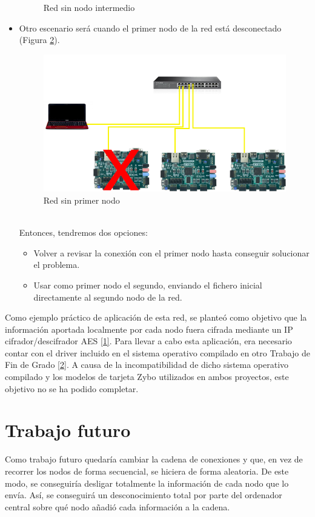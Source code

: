 \begin{itemize}
\begin{figure}[h]
		\caption{Red sin nodo intermedio}
		\label{Red sin nodo intermedio}
	\end{figure}
	\item Otro escenario será cuando el primer nodo de la red está desconectado (Figura \ref{Red sin primer nodo}).
	\begin{figure}[h]
		\centering
		\includegraphics[scale=0.5]{Epilogo/RedSinNodo1.png}
		\caption{Red sin primer nodo}
		\label{Red sin primer nodo}
	\end{figure}\\
	Entonces, tendremos dos opciones:
	\begin{itemize}
		\item Volver a revisar la conexión con el primer nodo hasta conseguir solucionar el problema.
		\item Usar como primer nodo el segundo, enviando el fichero inicial directamente al segundo nodo de la red.
	\end{itemize}
\end{itemize}

Como ejemplo práctico de aplicación de esta red, se planteó como objetivo que la información aportada localmente por cada nodo fuera cifrada mediante un IP cifrador/descifrador AES \hyperlink{1}{[1]}. Para llevar a cabo esta aplicación, era necesario contar con el driver incluido en el sistema operativo compilado en otro Trabajo de Fin de Grado \hyperlink{2}{[2]}. A causa de la incompatibilidad de dicho sistema operativo compilado y los modelos de tarjeta Zybo utilizados en ambos proyectos, este objetivo no se ha podido completar.

\section{Trabajo futuro}
Como trabajo futuro quedaría cambiar la cadena de conexiones y que, en vez de recorrer los nodos de forma secuencial, se hiciera de forma aleatoria. De este modo, se conseguiría desligar totalmente la información de cada nodo que lo envía. Así, se conseguirá un desconocimiento total por parte del ordenador central sobre qué nodo añadió cada información a la cadena.

